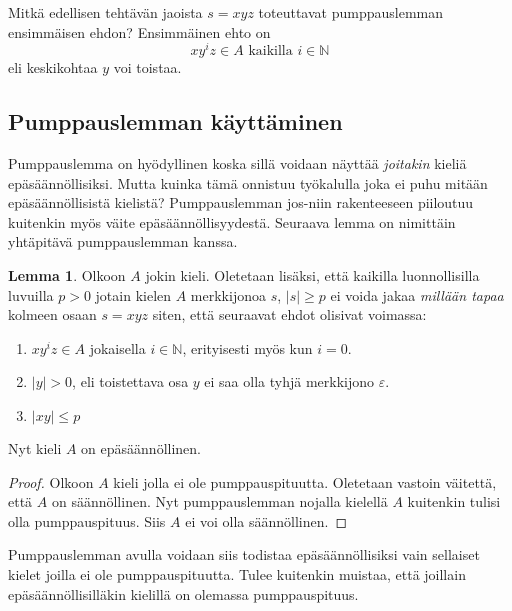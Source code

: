 \documentclass[a4paper,11pt]{article}
\theoremstyle{definition}
\newtheorem*{lemma}{Lemma}
\newcommand{\Nat}{\mathbb{N}}
\begin{document}
\vspace{5mm}

\begin{exercise}
    Mitkä edellisen tehtävän jaoista $s = xyz$ toteuttavat pumppauslemman
    ensimmäisen ehdon? Ensimmäinen ehto on
    \begin{equation*}
        xy^iz \in A \text{ kaikilla } i \in \Nat
    \end{equation*}
    eli keskikohtaa $y$ voi toistaa.
\end{exercise}

\subsection*{Pumppauslemman käyttäminen}

Pumppauslemma on hyödyllinen koska sillä voidaan näyttää \emph{joitakin} kieliä
epäsäännöllisiksi. Mutta kuinka tämä onnistuu työkalulla joka ei puhu
mitään epäsäännöllisistä kielistä? Pumppauslemman jos-niin
rakenteeseen piiloutuu kuitenkin myös väite epäsäännöllisyydestä.
Seuraava lemma on nimittäin yhtäpitävä pumppauslemman kanssa.

\begin{lemma}
  Olkoon $A$ jokin kieli. Oletetaan lisäksi, että kaikilla
  luonnollisilla luvuilla $p > 0$ jotain kielen $A$ merkkijonoa $s$,
  $|s| \ge p$ ei voida jakaa \emph{millään tapaa} kolmeen osaan $s =
  xyz$ siten, että seuraavat ehdot olisivat voimassa:
  \begin{enumerate}
  \item
    $xy^iz \in A$ jokaisella $i \in \Nat$, erityisesti myös kun $i =
    0$.
  \item
    $|y| > 0$, eli toistettava osa $y$ ei saa olla tyhjä merkkijono
    $\varepsilon$.
  \item
    $|xy| \leq p$
  \end{enumerate}
  Nyt kieli $A$ on epäsäännöllinen.
\end{lemma}
\begin{proof}
  Olkoon $A$ kieli jolla ei ole pumppauspituutta. Oletetaan vastoin
  väitettä, että $A$ on säännöllinen. Nyt pumppauslemman nojalla
  kielellä $A$ kuitenkin tulisi olla pumppauspituus. Siis $A$ ei voi
  olla säännöllinen.
\end{proof}

Pumppauslemman avulla voidaan siis todistaa epäsäännöllisiksi vain
sellaiset kielet joilla ei ole pumppauspituutta. Tulee kuitenkin
muistaa, että joillain epäsäännöllisilläkin kielillä on olemassa
pumppauspituus.
\end{document}
